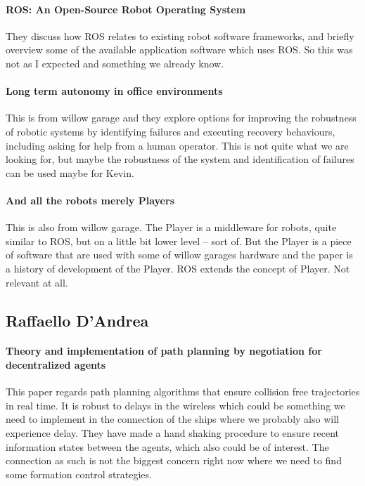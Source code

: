 {\vskip0pt\color{gray}
\paragraph{ROS: An Open-Source Robot Operating System}
They discuss how ROS relates to existing robot software frameworks, and briefly overview some of the available application software which uses ROS.
So this was not as I expected and something we already know. \citep{rosoverview}}

{\vskip0pt\color{gray}
\paragraph{Long term autonomy in office environments}
This is from willow garage and they explore options for improving the robustness of robotic systems by identifying failures and executing recovery behaviours, including asking for help from a human operator.
This is not quite what we are looking for, but maybe the robustness of the system and identification of failures can be used maybe for Kevin.}

{\vskip0pt\color{gray}
\paragraph{And all the robots merely Players}
This is also from willow garage. The Player is a middleware for robots, quite similar to ROS, but on a little bit lower level -- sort of. But the Player is a piece of software that are used with some of willow garages hardware and the paper is a history of development of the Player. ROS extends the concept of Player. Not relevant at all.}


\subsection{Raffaello D'Andrea}

\paragraph{Theory and implementation of path planning by negotiation for decentralized agents}
This paper regards path planning algorithms that ensure collision free trajectories in real time. It is robust to delays in the wireless which could be something we need to implement in the connection of the ships where we probably also will experience delay. They have made a hand shaking procedure to ensure recent information states between the agents, which also could be of interest.
The connection as such is not the biggest concern right now where we need to find some formation control strategies.

